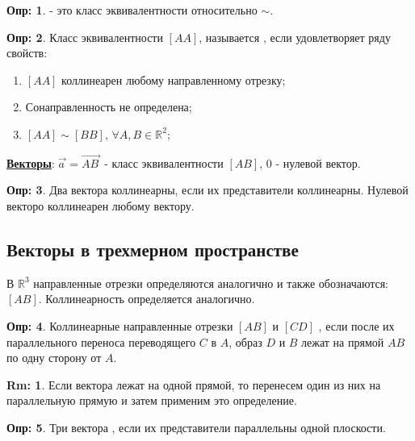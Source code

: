 \documentclass[12pt]{article}
\newcommand{\MR}{\mathbb{R}}
\theoremstyle{definition}
\newtheorem{defn}{Опр:}
\newtheorem{rem}{Rm:}
\newcommand{\vecm}[1]{\overrightarrow{#1\,}}
\begin{document}
\begin{defn}
	 - это класс эквивалентности относительно $\sim$.
\end{defn}
\begin{defn}
	Класс эквивалентности $[AA]$, называется , если удовлетворяет ряду свойств:
	\begin{enumerate}[label=\arabic*)]
		\item $[AA]$ коллинеарен любому направленному отрезку;
		\item Сонаправленность не определена;
		\item $[AA] \sim [BB], \, \forall A,B \in \MR^2$;
	\end{enumerate}
\end{defn}

\textbf{\uline{Векторы}}: $\vecm{a} = \vecm{AB}$ - класс эквивалентности $[AB]$, $0$ - нулевой вектор.
\begin{defn}
	Два вектора коллинеарны, если их представители коллинеарны. Нулевой векторо коллинеарен любому вектору.
\end{defn}

\subsection*{Векторы в трехмерном пространстве}
В $\MR^3$ направленные отрезки определяются аналогично и также обозначаются: $[AB]$. Коллинеарность определяется аналогично.
\begin{defn}
	Коллинеарные направленные отрезки $[AB]$ и $[CD]$ , если после их параллельного переноса переводящего $C$ в $A$, образ $D$ и $B$ лежат на прямой $AB$ по одну сторону от $A$.
\end{defn}
\begin{rem}
	Если вектора лежат на одной прямой, то перенесем один из них на параллельную прямую и затем применим это определение.
\end{rem}
\begin{defn}
	Три вектора , если их представители параллельны одной плоскости.
\end{defn}
\end{document}
